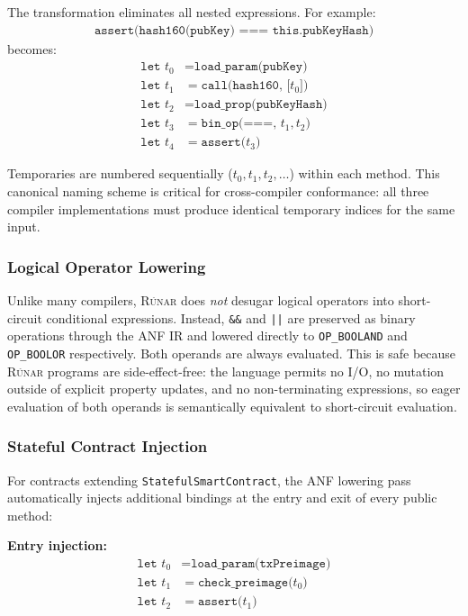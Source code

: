\documentclass[11pt,a4paper]{article}
\newcommand{\op}[1]{\texttt{OP\_#1}}
\newcommand{\runar}{\textsc{Rúnar}}
\begin{document}
The transformation eliminates all nested expressions. For example:
\begin{align*}
  \texttt{assert(hash160(pubKey) === this.pubKeyHash)}
\end{align*}
becomes:
\begin{align*}
  \texttt{let } t_0 &= \texttt{load\_param(pubKey)} \\
  \texttt{let } t_1 &= \texttt{call(hash160, [}t_0\texttt{])} \\
  \texttt{let } t_2 &= \texttt{load\_prop(pubKeyHash)} \\
  \texttt{let } t_3 &= \texttt{bin\_op(===, }t_1, t_2\texttt{)} \\
  \texttt{let } t_4 &= \texttt{assert(}t_3\texttt{)}
\end{align*}

Temporaries are numbered sequentially ($t_0, t_1, t_2, \ldots$) within each
method. This canonical naming scheme is critical for cross-compiler
conformance: all three compiler implementations must produce identical
temporary indices for the same input.

\subsubsection{Logical Operator Lowering}

Unlike many compilers, \runar{} does \emph{not} desugar logical operators
into short-circuit conditional expressions. Instead, \texttt{\&\&} and
\texttt{||} are preserved as binary operations through the ANF IR and
lowered directly to \op{BOOLAND} and \op{BOOLOR} respectively. Both
operands are always evaluated. This is safe because \runar{} programs are
side-effect-free: the language permits no I/O, no mutation outside of
explicit property updates, and no non-terminating expressions, so eager
evaluation of both operands is semantically equivalent to short-circuit
evaluation.

\subsubsection{Stateful Contract Injection}

For contracts extending \texttt{StatefulSmartContract}, the ANF lowering
pass automatically injects additional bindings at the entry and exit of
every public method:

\textbf{Entry injection:}
\begin{align*}
  \texttt{let } t_0 &= \texttt{load\_param(txPreimage)} \\
  \texttt{let } t_1 &= \texttt{check\_preimage(}t_0\texttt{)} \\
  \texttt{let } t_2 &= \texttt{assert(}t_1\texttt{)}
\end{align*}
\end{document}
